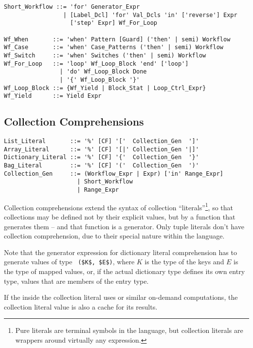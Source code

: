\begin{lstlisting}
Short_Workflow ::= 'for' Generator_Expr
                 | [Label_Dcl] 'for' Val_Dcls 'in' ['reverse'] Expr 
                   ['step' Expr] Wf_For_Loop
           
Wf_When       ::= 'when' Pattern [Guard] ('then' | semi) Workflow
Wf_Case       ::= 'when' Case_Patterns ('then' | semi) Workflow
Wf_Switch     ::= 'when' Switches ('then' | semi) Workflow
Wf_For_Loop   ::= 'loop' Wf_Loop_Block 'end' ['loop']
                | 'do' Wf_Loop_Block Done
                | '{' Wf_Loop_Block '}'
Wf_Loop_Block ::= {Wf_Yield | Block_Stat | Loop_Ctrl_Expr}
Wf_Yield      ::= Yield Expr
\end{lstlisting}





\subsection{Collection Comprehensions}
\label{sec:collection-comprehensions}

\syntax\begin{lstlisting}
List_Literal       ::= '%' [CF] '['  Collection_Gen  ']'
Array_Literal      ::= '%' [CF] '[|' Collection_Gen '|]'
Dictionary_Literal ::= '%' [CF] '{'  Collection_Gen  '}'
Bag_Literal        ::= '%' [CF] '('  Collection_Gen  ')'
Collection_Gen     ::= (Workflow_Expr | Expr) ['in' Range_Expr]
                     | Short_Workflow
                     | Range_Expr
\end{lstlisting}

Collection comprehensions extend the syntax of collection ``literals''\footnote{Pure literals are terminal symbols in the language, but collection literals are wrappers around virtually any expression.}, so that collections may be defined not by their explicit values, but by a function that generates them -- and that function is a generator. Only tuple literals don't have collection comprehension, due to their special nature within the language. 

Note that the generator expression for dictionary literal comprehension has to generate values of type ~\lstinline!($K$, $E$)!, where $K$ is the type of the keys and $E$ is the type of mapped values, or, if the actual dictionary type defines its own entry type, values that are members of the entry type. 

If the  inside the collection literal uses  or similar on-demand computations, the collection literal value is also a cache for its results. 

